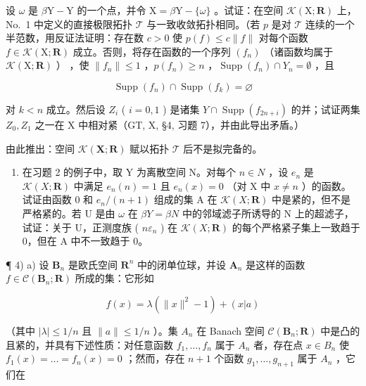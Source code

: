 设 \(\omega\) 是 \(\beta\mathrm{Y}-\mathrm{Y}\) 的一个点，并令 \(\mathrm{X}=\beta\mathrm{Y}-\{\omega\}\) 。试证：在空间 \(\mathcal{K}(\mathrm{X};\mathbf{R})\) 上，No.~1 中定义的直接极限拓扑 \(\mathcal{T}\) 与一致收敛拓扑相同。（若 \(p\) 是对 \(\mathcal{T}\) 连续的一个半范数，用反证法证明：存在数 \(c > 0\) 使 \(p(f) \leqslant c \| f \|\) 对每个函数 \(f \in \mathcal{K}(\mathrm{X};\mathbf{R})\) 成立。否则，将存在函数的一个序列 \((f_n)\) （诸函数均属于 \(\mathcal{K}(\mathrm{X};\mathbf{R})\) ） ，使 \(\| f_n \| \leqslant 1\) ，\(p(f_n) \geqslant n\) ，\(\operatorname{Supp}(f_n) \cap Y_n = \emptyset\) ，且

\[
\operatorname{Supp} (f _ {n}) \cap \operatorname{Supp} (f _ {k}) = \varnothing
\]

对 \(k < n\) 成立。然后设 \(Z_{i}\) ( \(i = 0,1\) ) 是诸集 \(Y \cap \operatorname{Supp}(f_{2n + i})\) 的并；试证两集 \(Z_{0}, Z_{1}\) 之一在 X 中相对紧（GT, X, §4, 习题 7），并由此导出矛盾。）

由此推出：空间 \(\mathcal{K}(\mathbf{X};\mathbf{R})\) 赋以拓扑 \(\mathcal{T}\) 后不是拟完备的。

\begin{enumerate}
\def\labelenumi{\arabic{enumi})}
\setcounter{enumi}{2}
\tightlist
\item
  在习题 2 的例子中，取 Y 为离散空间 N。对每个 \(n \in N\) ，设 \(e_n\) 是 \(\mathcal{K}(X; \mathbf{R})\) 中满足 \(e_n(n) = 1\) 且 \(e_n(x) = 0\) （对 X 中 \(x \neq n\) ）的函数。试证由函数 0 和 \(e_n/(n + 1)\) 组成的集 A 在 \(\mathcal{K}(X; \mathbf{R})\) 中是紧的，但不是严格紧的。若 U 是由 \(\omega\) 在 \(\beta Y = \beta N\) 中的邻域滤子所诱导的 N 上的超滤子，试证：关于 U，正测度族 ( \(n\varepsilon_n\) ) 在 \(\mathcal{K}(X; \mathbf{R})\) 的每个严格紧子集上一致趋于 0，但在 A 中不一致趋于 0。
\end{enumerate}

¶ 4) a) 设 \(\mathbf{B}_n\) 是欧氏空间 \(\mathbf{R}^n\) 中的闭单位球，并设 \(\mathbf{A}_n\) 是这样的函数 \(f \in \mathcal{C}(\mathbf{B}_n; \mathbf{R})\) 所成的集：它形如

\[
f (x) = \lambda (\| x \| ^ {2} - 1) + (x | a)
\]

（其中 \(|\lambda| \leqslant 1/n\) 且 \(\|a\| \leqslant 1/n\) ）。集 \(A_n\) 在 Banach 空间 \(\mathcal{C}(\mathbf{B}_n; \mathbf{R})\) 中是凸的且紧的，并具有下述性质：对任意函数 \(f_1, \ldots, f_n\) 属于 \(A_n\) 者，存在点 \(x \in B_n\) 使 \(f_1(x) = \ldots = f_n(x) = 0\) ；然而，存在 \(n + 1\) 个函数 \(g_1, \ldots, g_{n+1}\) 属于 \(A_n\) ，它们在

